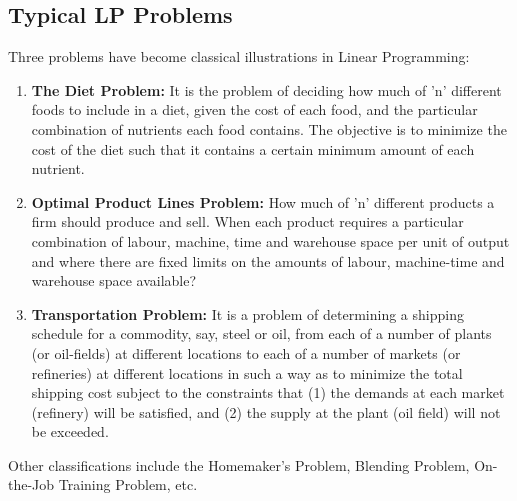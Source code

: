 \documentclass[a4paper,openany]{book}
\begin{document}
			\subsection{Typical LP Problems}
				Three problems have become classical illustrations in Linear Programming: \cite{stats}
				\begin{enumerate}
					\item \textbf{The Diet Problem:} It is the problem of deciding how much of 'n' different foods to include in a diet, given the cost of each food, and the particular combination of nutrients each food contains. The objective is to minimize the cost of the diet such that it contains a certain minimum amount of each nutrient.
					\item \textbf{Optimal Product Lines Problem:} How much of 'n' different products a firm should produce and sell. When each product requires a particular combination of labour, machine, time and warehouse space per unit of output and where there are fixed limits on the amounts of labour, machine-time and warehouse space available?
					\item \textbf{Transportation Problem:} It is a problem of determining a shipping schedule for a commodity, say, steel or oil, from each of a number of plants (or oil-fields) at different locations to each of a number of markets (or refineries) at different locations in such a way as to minimize the total shipping cost subject to the constraints that (1) the demands at each market (refinery) will be satisfied, and (2) the supply at the plant (oil field) will not be exceeded.
				\end{enumerate}
				Other classifications include the Homemaker's Problem, Blending Problem, On-the-Job Training Problem, etc. \cite{dantzig,dantzig2}
\end{document}
